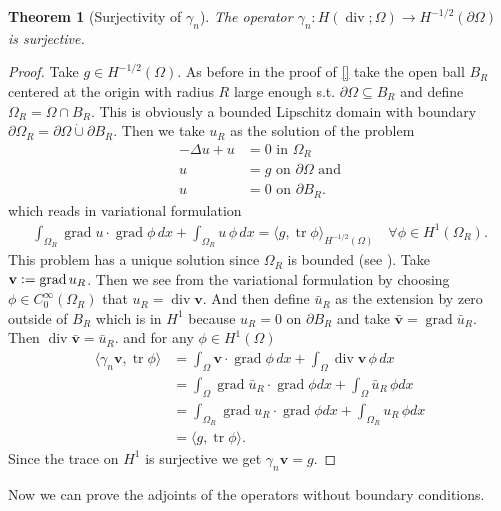 \documentclass[12pt,a4paper]{article}
\numberwithin{equation}{subsection}
\numberwithin{lemma}{subsection}
\newtheorem{theorem}[lemma]{Theorem}
\theoremstyle{definition}
\DeclareMathOperator{\diver}{div}
\DeclareMathOperator{\grad}{grad}
\DeclareMathOperator{\tr}{tr}
\begin{document}
\begin{theorem}[Surjectivity of $\gamma_n$]
    The operator $\gamma_n: H(\diver; \Omega) \rightarrow H^{-1/2}(\partial\Omega)$ 
    is surjective.
\end{theorem}
\begin{proof}
    Take $g \in H^{-1/2}(\Omega)$. As before in the proof of \ref{} take 
    the open ball $B_R$ centered at the origin with radius $R$ large enough 
    s.t. $\partial \Omega\subseteq B_R$ and define $\Omega_R = \Omega \cap B_R$.
    This is obviously a bounded Lipschitz domain with boundary 
    $\partial \Omega_R = \partial \Omega \dot{\cup} \partial B_R$.
    Then we take $u_R$ as the solution 
    of the problem 
    \begin{align*}
        -\Delta u + u &= 0 \text{ in $\Omega_R$} \\
        u &= g \text{ on $\partial \Omega$ and} 
        \\ u &= 0 \text{ on $\partial B_R$.} 
    \end{align*}
    which reads in variational formulation
    \begin{align*}
        \int_{\Omega_R} \grad u \cdot \grad \phi \, dx + \int_{\Omega_R} u \, \phi \,dx 
        = \langle g, \tr \phi \rangle_{H^{-1/2}(\Omega)} \quad \forall \phi \in H^1(\Omega_R).
    \end{align*}
    This problem has a unique solution since $\Omega_R$ is bounded (see \cite[Thm. 3.12]{monk}).
    Take $\mathbf{v} \vcentcolon= \grad u_R$. Then we see from the variational 
    formulation by choosing $\phi \in C_0^\infty(\Omega_R)$ that $u_R = \diver \mathbf{v}$.
    And then define $\bar{u}_R$ as the extension by zero outside of $B_R$ which is in $H^1$ 
    because $u_R = 0$ on $\partial B_R$ and take $\bar{\mathbf{v}} = \grad \bar{u}_R$. 
    Then $\diver \bar{\mathbf{v}} = \bar{u}_R$.
    and for any $\phi \in H^1(\Omega)$
    \begin{align*}
        \langle \gamma_n \mathbf{v}, \tr \phi \rangle 
        &= \int_\Omega \mathbf{v} \cdot \grad \phi \, dx 
            + \int_\Omega \diver \mathbf{v} \, \phi \, dx
        \\ &= \int_\Omega \grad \bar{u}_R \cdot \grad \phi dx
            + \int_\Omega \bar{u}_R \, \phi dx 
        \\ &= \int_{\Omega_R} \grad u_R \cdot \grad \phi dx
            + \int_{\Omega_R} u_R \, \phi dx 
        \\ &= \langle g, \tr \phi \rangle.
    \end{align*}
    Since the trace on $H^1$ is surjective we get $\gamma_n \mathbf{v} = g$.
\end{proof}
Now we can prove the adjoints of the operators without boundary conditions.
\end{document}
